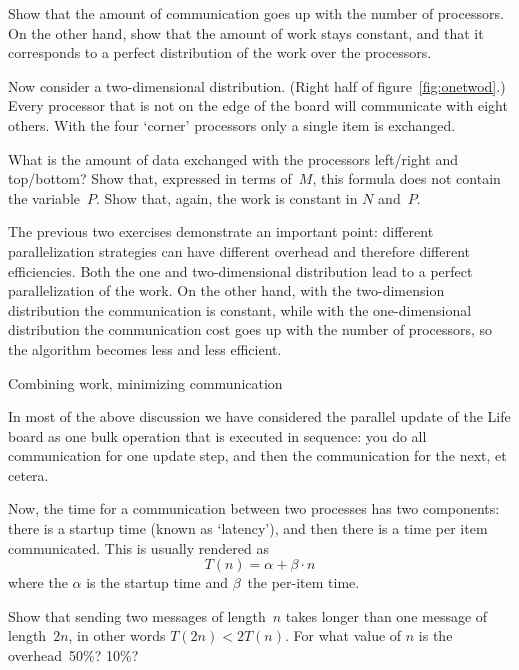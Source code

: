 \begin{exercise}
  Show that the amount of communication goes up with the number of
  processors. On the other hand, show that the amount of work stays
  constant, and that it corresponds to a perfect distribution of the
  work over the processors.
\end{exercise}

Now consider a two-dimensional distribution. (Right half of
figure~\ref{fig:onetwod}.)  Every processor that is not on the edge of
the board will communicate with eight others. With the four `corner'
processors only a single item is exchanged.

\begin{exercise}
  What is the amount of data exchanged with the processors left/right
  and top/bottom? Show that, expressed in terms of~$M$, this formula
  does not contain the variable~$P$. Show that, again, the work is
  constant in $N$ and~$P$.
\end{exercise}

The previous two exercises demonstrate an important point: different
parallelization strategies can have different overhead and therefore
different efficiencies. Both the
one and two-dimensional distribution lead to a perfect parallelization
of the work. On the other hand, with the two-dimension distribution
the communication is constant, while with the one-dimensional distribution
the communication cost goes up with the number of processors, so the
algorithm becomes less and less efficient.

 {Combining work, minimizing communication}

In most of the above discussion we have considered the parallel update
of the Life board as one bulk operation that is executed in sequence:
you do all communication for one update step, and then the communication
for the next, et cetera.

Now, the time for a communication between two processes has two components:
there is a startup time (known as `latency'), and then there is a time
per item communicated. This is usually rendered as
\[ T(n) = \alpha+\beta\cdot n \]
where the $\alpha$ is the startup time and $\beta$~the per-item time.
 
\begin{exercise}
  Show that sending two messages of length~$n$ takes longer
  than one message of length~$2n$, in other words $T(2n)<2T(n)$.
  For what value of $n$ is the overhead~50\%? 10\%?
\end{exercise}

